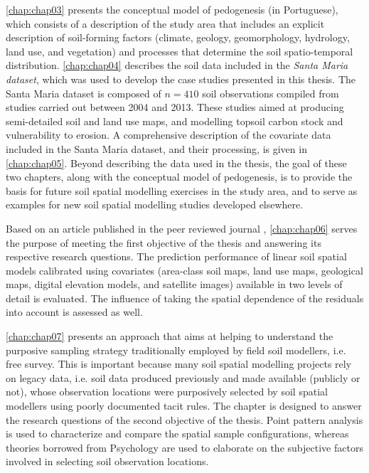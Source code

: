 \autoref{chap:chap03} presents the conceptual model of pedogenesis (in Portuguese), which consists 
of a description of the study area that includes an explicit description of soil-forming factors (climate, 
geology, geomorphology, hydrology, land use, and vegetation) and processes that determine the soil 
spatio-temporal distribution. \autoref{chap:chap04} describes the soil data included in the 
\emph{Santa Maria dataset}, which was used to develop the case studies presented in this thesis. The Santa
Maria dataset is composed of $n = 410$ soil observations compiled from studies carried out between \num{2004} 
and \num{2013}. These studies aimed at producing semi-detailed soil and land use maps, and modelling topsoil 
carbon stock and vulnerability to erosion. A comprehensive description of the covariate data included in the 
Santa Maria dataset, and their processing, is given in \autoref{chap:chap05}. Beyond describing 
the data used in the thesis, the goal of these two chapters, along with the conceptual model of pedogenesis, is 
to provide the basis for future soil spatial modelling exercises in the study area, and to serve as examples 
for new soil spatial modelling studies developed elsewhere.

Based on an article published in the peer reviewed journal \geoderma, \autoref{chap:chap06} serves 
the purpose of meeting the first objective of the thesis and answering its respective research questions. The 
prediction performance of linear soil spatial models calibrated using covariates (area-class soil maps, land 
use maps, geological maps, digital elevation models, and satellite images) available in two levels of detail 
is evaluated. The influence of taking the spatial dependence of the residuals into account is assessed as 
well. 

\autoref{chap:chap07} presents an approach that aims at helping to understand the purposive 
sampling strategy traditionally employed by field soil modellers, i.e. free survey. This is important because 
many soil spatial modelling projects rely on legacy data, i.e. soil data produced previously and made available 
(publicly or not), whose observation locations were purposively selected by soil spatial modellers using 
poorly documented tacit rules. The chapter is designed to answer the research questions of the second objective 
of the thesis. Point pattern analysis is used to characterize and compare the spatial sample configurations, 
whereas theories borrowed from Psychology are used to elaborate on the subjective factors involved in selecting 
soil observation locations.

